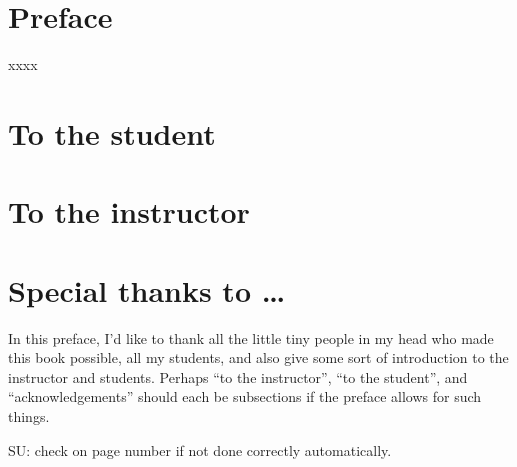 \section*{Preface}

xxxx
\section*{To the student}

\section*{To the instructor}

\section*{Special thanks to \ldots}

In this preface, I'd like to thank all the little tiny people in my head who made this book possible, all my students, and also give some sort of introduction to the instructor and students.  Perhaps ``to the instructor'', ``to the student'', and ``acknowledgements'' should each be subsections if the preface allows for such things.

SU: check on page number if not done correctly automatically.